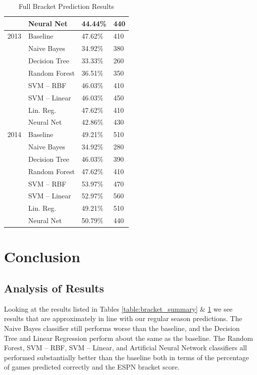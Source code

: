 \documentclass[]{article}
\begin{document}
\begin{table}[ht]
\begin{tabular}{@{}llll@{}}
     & Neural Net           & 44.44\%         & 440           \\ \midrule
2013 & Baseline             & 47.62\%         & 410           \\
     & Naive Bayes          & 34.92\%         & 380           \\
     & Decision Tree        & 33.33\%         & 260           \\
     & Random Forest        & 36.51\%         & 350           \\
     & SVM -- RBF           & 46.03\%         & 410           \\
     & SVM -- Linear        & 46.03\%         & 450           \\
     & Lin. Reg.            & 47.62\%         & 410           \\
     & Neural Net           & 42.86\%         & 430           \\ \midrule
2014 & Baseline             & 49.21\%         & 510           \\
     & Naive Bayes          & 34.92\%         & 280           \\
     & Decision Tree        & 46.03\%         & 390           \\
     & Random Forest        & 47.62\%         & 410           \\
     & SVM -- RBF           & 53.97\%         & 470           \\
     & SVM -- Linear        & 52.97\%         & 560           \\
     & Lin. Reg.            & 49.21\%         & 510           \\
     & Neural Net           & 50.79\%         & 440           \\
\bottomrule
\end{tabular}
\caption{Full Bracket Prediction Results}
\label{table:bracket_prediction}
\end{table}

\section{Conclusion}
\subsection{Analysis of Results}

Looking at the results listed in Tables \ref{table:bracket_summary} \& \ref{table:bracket_prediction} we see results that are approximately in line with our regular season predictions. The Naive Bayes classifier still performs worse than the baseline, and the Decision Tree and Linear Regression perform about the same as the baseline. The Random Forest, SVM -- RBF, SVM -- Linear, and Artificial Neural Network classifiers all performed substantially better than the baseline both in terms of the percentage of games predicted correctly and the ESPN bracket score. 
\end{document}
